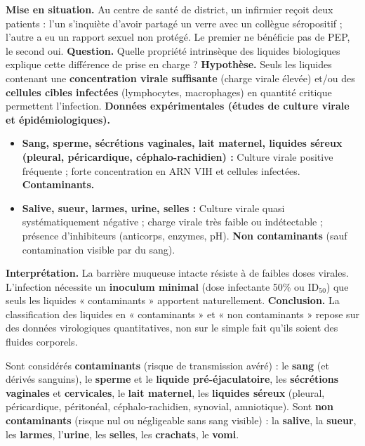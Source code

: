 \documentclass[11pt]{article}
\begin{document}
\begin{experience}
\textbf{Mise en situation.} Au centre de santé de district, un infirmier reçoit deux patients : l'un s'inquiète d'avoir partagé un verre avec un collègue séropositif ; l'autre a eu un rapport sexuel non protégé. Le premier ne bénéficie pas de PEP, le second oui.
\textbf{Question.} Quelle propriété intrinsèque des liquides biologiques explique cette différence de prise en charge ?
\textbf{Hypothèse.} Seuls les liquides contenant une \textbf{concentration virale suffisante} (charge virale élevée) et/ou des \textbf{cellules cibles infectées} (lymphocytes, macrophages) en quantité critique permettent l'infection.
\textbf{Données expérimentales (études de culture virale et épidémiologiques).}
\begin{itemize}
    \item \textbf{Sang, sperme, sécrétions vaginales, lait maternel, liquides séreux (pleural, péricardique, céphalo-rachidien) :} Culture virale positive fréquente ; forte concentration en ARN VIH et cellules infectées. \textbf{Contaminants.}
    \item \textbf{Salive, sueur, larmes, urine, selles :} Culture virale quasi systématiquement négative ; charge virale très faible ou indétectable ; présence d'inhibiteurs (anticorps, enzymes, pH). \textbf{Non contaminants} (sauf contamination visible par du sang).
\end{itemize}
\textbf{Interprétation.} La barrière muqueuse intacte résiste à de faibles doses virales. L'infection nécessite un \textbf{inoculum minimal} (dose infectante 50\% ou ID$_{50}$) que seuls les liquides « contaminants » apportent naturellement.
\textbf{Conclusion.} La classification des liquides en « contaminants » et « non contaminants » repose sur des données virologiques quantitatives, non sur le simple fait qu'ils soient des fluides corporels.
\end{experience}

\begin{definition}
Sont considérés \textbf{contaminants} (risque de transmission avéré) : le \textbf{sang} (et dérivés sanguins), le \textbf{sperme} et le \textbf{liquide pré-éjaculatoire}, les \textbf{sécrétions vaginales} et \textbf{cervicales}, le \textbf{lait maternel}, les \textbf{liquides séreux} (pleural, péricardique, péritonéal, céphalo-rachidien, synovial, amniotique).
Sont \textbf{non contaminants} (risque nul ou négligeable sans sang visible) : la \textbf{salive}, la \textbf{sueur}, les \textbf{larmes}, l'\textbf{urine}, les \textbf{selles}, les \textbf{crachats}, le \textbf{vomi}.
\end{definition}
\end{document}
